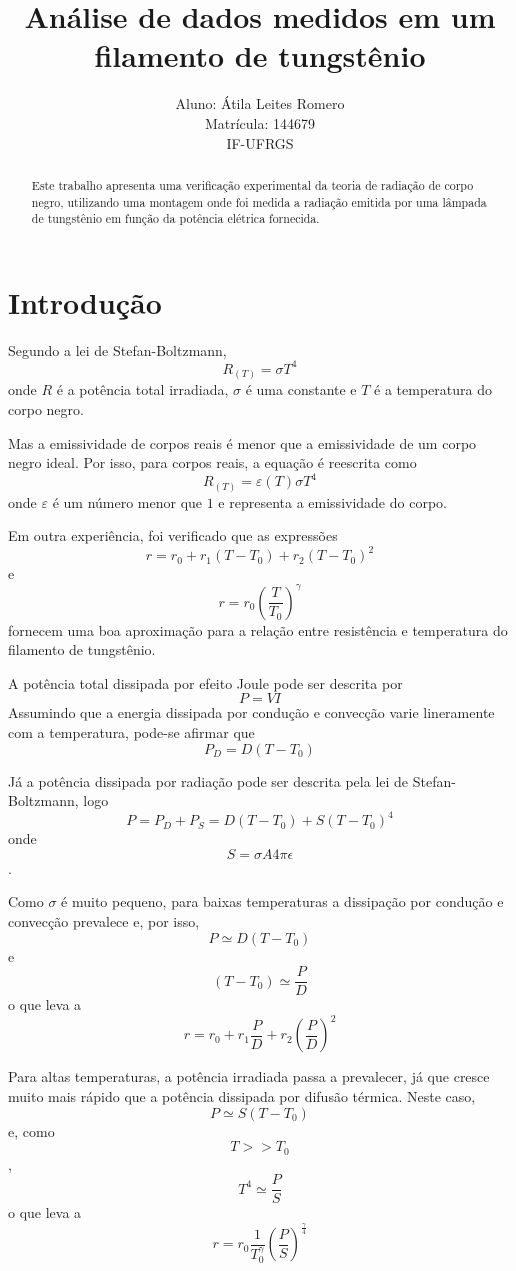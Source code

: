 \documentclass[brazilian,12pt,a4paper,final]{article}
\title{Análise de dados medidos em um filamento de tungstênio}
\author{Aluno: Átila Leites Romero \\ Matrícula: 144679 \\ IF-UFRGS}
\begin{document}
\maketitle

\begin{abstract}
Este trabalho apresenta uma verificação experimental da teoria de radiação de corpo negro, 
utilizando uma montagem onde foi medida a radiação emitida por uma lâmpada de tungstênio 
em função da potência elétrica fornecida.
\end{abstract}

\section{Introdução}
Segundo a lei de Stefan-Boltzmann,
$$ R_{(T)}=\sigma T^4$$
onde $R$ é a potência total irradiada, $\sigma$ é uma constante 
e $T$ é a temperatura do corpo negro. 

Mas a emissividade de corpos reais é menor que a emissividade de um corpo negro ideal.
Por isso, para corpos reais, a equação é reescrita como 
$$ R_{(T)}=\varepsilon (T)\sigma T^4$$
onde $\varepsilon$ é um número menor que $1$ e representa a emissividade do corpo.

Em outra experiência, foi verificado que as expressões
$$r=r_0+r_1(T-T_0)+r_2(T-T_0)^2$$ 
e 
$$r=r_0(\frac{T}{T_0})^\gamma$$
fornecem uma boa aproximação para a
relação entre resistência e temperatura do filamento de tungstênio.

A potência total dissipada por efeito Joule pode ser descrita por 
$$P=VI$$ 
Assumindo que a energia dissipada por condução e convecção varie lineramente 
com a temperatura, pode-se afirmar que 
$$P_D=D(T-T_0)$$

Já a potência dissipada por radiação pode ser descrita pela lei de Stefan-Boltzmann, 
logo 
$$P=P_D+P_S=D(T-T_0)+S(T-T_0)^4$$
onde 
$$S=\sigma A 4\pi\epsilon$$.

Como $\sigma$ é muito pequeno, 
para baixas temperaturas a dissipação por condução e convecção prevalece e,
por isso, 
$$P\simeq D(T-T_0)$$ 
e 
$$(T-T_0)\simeq \frac{P}{D}$$
o que leva a 
$$r=r_0+r_1\frac{P}{D}+r_2(\frac{P}{D})^2$$

Para altas temperaturas, a potência irradiada passa a prevalecer, 
já que cresce muito mais rápido que a potência dissipada por difusão térmica.
Neste caso,  
$$P\simeq S(T-T_0)$$ 
e, como 
$$T>>T_0$$, 
$$T^4\simeq \frac{P}{S}$$
o que leva a 
$$r=r_0\frac{1}{T_0^\gamma}(\frac{P}{S})^\frac{\gamma}{4}$$
\end{document}

